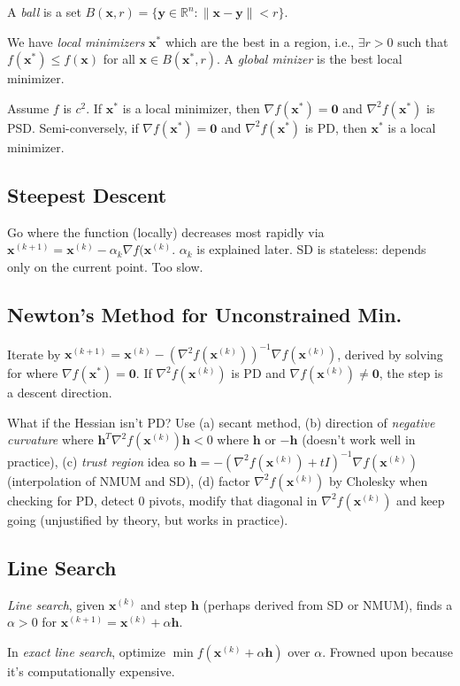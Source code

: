 \documentclass[landscape,10pt,letterpaper]{article}
\newcommand{\subheading}[1]{\vspace{-1.2em} \subsection*{#1} \vspace{-0.8em}}
\begin{document}
\begin{multicols}{4}
A \emph{ball} is a set $B(\mathbf{x}, r) = \{ \mathbf{y} \in \mathbb{R}^n : \| \mathbf{x} - \mathbf{y} \| < r \}$.

We have \emph{local minimizers} $\mathbf{x}^*$ which are the best in a region, i.e., $\exists r > 0$ such that $f(\mathbf{x}^*) \leq f(\mathbf{x})$ for all $\mathbf{x} \in B(\mathbf{x}^*, r)$.  A \emph{global minizer} is the best local minimizer.

Assume $f$ is $c^2$.  If $\mathbf{x}^*$ is a local minimizer, then $\nabla f(\mathbf{x}^*) = \mathbf{0}$ and $\nabla^2 f(\mathbf{x}^*)$ is PSD.  Semi-conversely, if $\nabla f(\mathbf{x}^*) = \mathbf{0}$ and $\nabla^2 f(\mathbf{x}^*)$ is PD, then $\mathbf{x}^*$ is a local minimizer.

\subheading{Steepest Descent}

Go where the function (locally) decreases most rapidly via $\mathbf{x}^{(k+1)} = \mathbf{x}^{(k)} - \alpha_k \nabla f(\mathbf{x}^{(k)}$.  $\alpha_k$ is explained later.  SD is stateless: depends only on the current point.  Too slow.

\subheading{Newton's Method for Unconstrained Min.}

Iterate by $\mathbf{x}^{(k+1)} = \mathbf{x}^{(k)} - ( \nabla^2 f(\mathbf{x}^{(k)}))^{-1} \nabla f(\mathbf{x}^{(k)})$, derived by solving for where $\nabla f(\mathbf{x}^*) = \mathbf{0}$.  If $\nabla^2 f(\mathbf{x}^{(k)})$ is PD and $\nabla f(\mathbf{x}^{(k)}) \neq \mathbf{0}$, the step is a descent direction.

What if the Hessian isn't PD?  Use (a) secant method, (b) direction of \emph{negative curvature} where $\mathbf{h}^T \nabla^2 f(\mathbf{x}^{(k)}) \mathbf{h} < 0$ where $\mathbf{h}$ or $-\mathbf{h}$ (doesn't work well in practice), (c) \emph{trust region} idea so $\mathbf{h} = -( \nabla^2 f(\mathbf{x}^{(k)}) + tI)^{-1} \nabla f(\mathbf{x}^{(k)})$ (interpolation of NMUM and SD), (d) factor $\nabla^2 f(\mathbf{x}^{(k)})$ by Cholesky when checking for PD, detect $0$ pivots, modify that diagonal in $\nabla^2 f(\mathbf{x}^{(k)})$ and keep going (unjustified by theory, but works in practice).

\subheading{Line Search}

\emph{Line search}, given $\mathbf{x}^{(k)}$ and step $\mathbf{h}$ (perhaps derived from SD or NMUM), finds a $\alpha > 0$ for $\mathbf{x}^{(k+1)} = \mathbf{x}^{(k)} + \alpha \mathbf{h}$.

In \emph{exact line search}, optimize $\min f(\mathbf{x}^{(k)} + \alpha \mathbf{h})$ over $\alpha$.  Frowned upon because it's computationally expensive.


\end{multicols}
\end{document}

